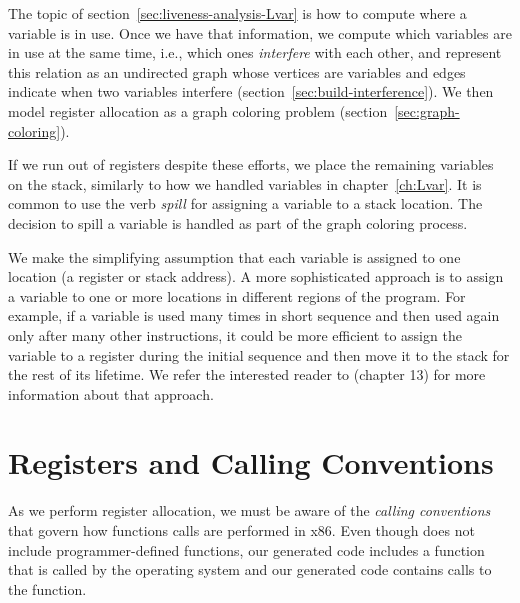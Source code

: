 \documentclass[7x10]{TimesAPriori_MIT}%
\numberwithin{theorem}{chapter}
\numberwithin{definition}{chapter}
\numberwithin{equation}{chapter}
\begin{document}
The topic of section~\ref{sec:liveness-analysis-Lvar} is how to
compute where a variable is in use.  Once we have that information, we
compute which variables are in use at the same time, i.e., which ones
\emph{interfere} with each other, and
represent this relation as an undirected graph whose vertices are
variables and edges indicate when two variables interfere
(section~\ref{sec:build-interference}). We then model register
allocation as a graph coloring problem
(section~\ref{sec:graph-coloring}).

If we run out of registers despite these efforts, we place the
remaining variables on the stack, similarly to how we handled
variables in chapter~\ref{ch:Lvar}. It is common to use the verb
\emph{spill} for assigning a variable to a stack
location. The decision to spill a variable is handled as part of the
graph coloring process.

We make the simplifying assumption that each variable is assigned to
one location (a register or stack address). A more sophisticated
approach is to assign a variable to one or more locations in different
regions of the program.  For example, if a variable is used many times
in short sequence and then used again only after many other
instructions, it could be more efficient to assign the variable to a
register during the initial sequence and then move it to the stack for
the rest of its lifetime. We refer the interested reader to
\citet{Cooper:2011aa} (chapter 13) for more information about that
approach.


\section{Registers and Calling Conventions}
\label{sec:calling-conventions}

As we perform register allocation, we must be aware of the
\emph{calling conventions}  that
govern how functions calls are performed in x86.
%
Even though \LangVar{} does not include programmer-defined functions,
our generated code includes a  function that is called by
the operating system and our generated code contains calls to the
 function.
\end{document}
